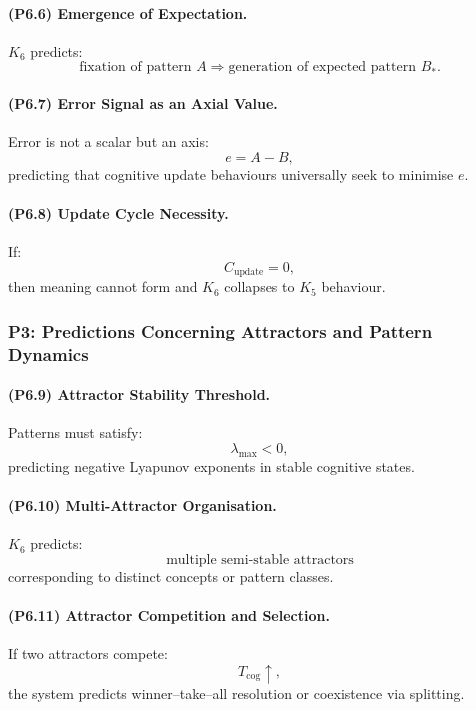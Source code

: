 \paragraph{(P6.6) Emergence of Expectation.}
$K_6$ predicts:
\[
\text{fixation of pattern } A \Rightarrow \text{generation of expected pattern } B_\ast.
\]

\paragraph{(P6.7) Error Signal as an Axial Value.}
Error is not a scalar but an axis:
\[
e = A - B,
\]
predicting that cognitive update behaviours universally seek to minimise $e$.

\paragraph{(P6.8) Update Cycle Necessity.}
If:
\[
C_{\mathrm{update}} = 0,
\]
then meaning cannot form and $K_6$ collapses to $K_5$ behaviour.

\subsubsection{P3: Predictions Concerning Attractors and Pattern Dynamics}

\paragraph{(P6.9) Attractor Stability Threshold.}
Patterns must satisfy:
\[
\lambda_{\max} < 0,
\]
predicting negative Lyapunov exponents in stable cognitive states.

\paragraph{(P6.10) Multi-Attractor Organisation.}
$K_6$ predicts:
\[
\text{multiple semi-stable attractors}
\]
corresponding to distinct concepts or pattern classes.

\paragraph{(P6.11) Attractor Competition and Selection.}
If two attractors compete:
\[
T_{\mathrm{cog}} \uparrow,
\]
the system predicts winner–take–all resolution or coexistence via splitting.

